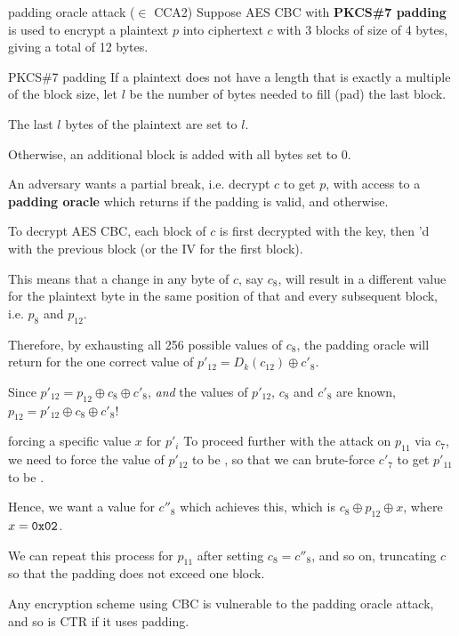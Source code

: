\begin{defn}{padding oracle attack ($\in$ CCA2)}
    Suppose AES CBC with \textbf{PKCS\#7 padding} is used to encrypt a plaintext $p$ into ciphertext $c$ with 3 blocks of size of 4 bytes, giving a total of 12 bytes.

    \begin{defn}{PKCS\#7 padding}
        If a plaintext does not have a length that is exactly a multiple of the block size, let $l$ be the number of bytes needed to fill (pad) the last block.

        The last $l$ bytes of the plaintext are set to $l$.

        Otherwise, an additional block is added with all bytes set to 0.
    \end{defn}

    An adversary wants a partial break, i.e. decrypt $c$ to get $p$, with access to a \textbf{padding oracle} which returns  if the padding is valid, and  otherwise.

    To decrypt AES CBC, each block of $c$ is first decrypted with the key, then 'd with the previous block (or the IV for the first block).

    This means that a change in any byte of $c$, say $c_8$, will result in a different value for the plaintext byte in the same position of that and every subsequent block, i.e. $p_8$ and $p_{12}$.

    Therefore, by exhausting all 256 possible values of $c_8$, the padding oracle will return  for the one correct value of $p'_{12} = D_{k}(c_{12}) \oplus c'_8$.

    Since $p'_{12} = p_{12} \oplus c_8 \oplus c'_8$, \textit{and} the values of $p'_{12}$, $c_8$ and $c'_8$ are known, $p_{12} = p'_{12} \oplus c_8 \oplus c'_{8}$!

    \begin{defn}{forcing a specific value $x$ for $p'_i$}
        To proceed further with the attack on $p_{11}$ via $c_7$, we need to force the value of $p'_{12}$ to be , so that we can brute-force $c'_7$ to get $p'_{11}$ to be .

        Hence, we want a value for $c''_8$ which achieves this, which is $c_8 \oplus p_{12} \oplus x$, where $x = \texttt{0x02}$.
    \end{defn}

    We can repeat this process for $p_{11}$ after setting $c_8 = c''_8$, and so on, truncating $c$ so that the padding does not exceed one block.
\end{defn}

Any encryption scheme using CBC is vulnerable to the padding oracle attack, and so is CTR if it uses padding.